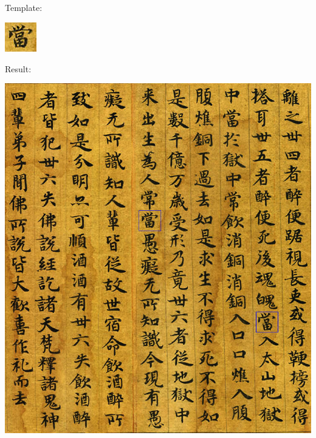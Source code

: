 \documentclass[a4paper,11pt]{article}
\begin{document}
\subsection{}
Template:
\begin{center}
\includegraphics[width=.2\textwidth]{test4}
\end{center}
Result:
\begin{center}
\includegraphics[width=.8\textwidth]{result4}
\end{center}
\end{document}
